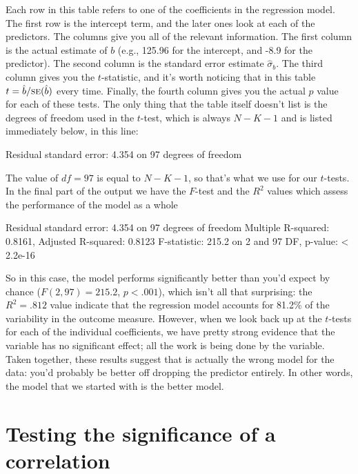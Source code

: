 Each row in this table refers to one of the coefficients in the regression model. The first row is the intercept term, and the later ones look at each of the predictors. The columns give you all of the relevant information. The first column is the actual estimate of $b$ (e.g., 125.96 for the intercept, and -8.9 for the  predictor). The second column is the standard error estimate $\hat\sigma_b$. The third column gives you the $t$-statistic, and it's worth noticing that in this table $t= \hat{b}/ \mbox{\textsc{se}}(\hat{b})$ every time. Finally, the fourth column gives you the actual $p$ value for each of these tests. The only thing that the table itself doesn't list is the degrees of freedom used in the $t$-test, which is always $N-K-1$ and is listed immediately below, in this line:
\begin{rblock}
Residual standard error: 4.354 on 97 degrees of freedom
\end{rblock}
The value of $df = 97$ is equal to $N-K-1$, so that's what we use for our $t$-tests. In the final part of the output we have the $F$-test and the $R^2$ values which assess the performance of the model as a whole
\begin{rblock}
Residual standard error: 4.354 on 97 degrees of freedom
Multiple R-squared: 0.8161,	Adjusted R-squared: 0.8123 
F-statistic: 215.2 on 2 and 97 DF,  p-value: < 2.2e-16 
\end{rblock}
So in this case, the model performs significantly better than you'd expect by chance ($F(2,97) = 215.2$, $p<.001$), which isn't all that surprising: the $R^2 = .812$ value indicate that the regression model accounts for 81.2\% of the variability in the outcome measure. However, when we look back up at the $t$-tests for each of the individual coefficients, we have pretty strong evidence that the  variable has no significant effect; all the work is being done by the  variable. Taken together, these results suggest that  is actually the wrong model for the data: you'd probably be better off dropping the  predictor entirely. In other words, the  model that we started with is the better model.


\section{Testing the significance of a correlation~\label{sec:corrhyp}}


